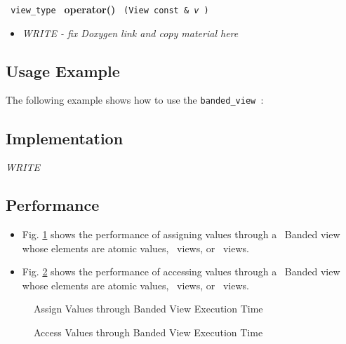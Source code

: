\noindent
\texttt{%
view\_type
}
\newline
\textbf{operator()}%
\texttt{%
(View const \&
\textit{v}%
)
}

\begin{itemize}
\item
\textit{WRITE - fix Doxygen link and copy material here}
\end{itemize}

\subsection{Usage Example} \label{sec-band-vw-use}

The following example shows how to use the \texttt{banded\_view }:


\subsection{Implementation} \label{sec-band-vw-impl}

\textit{WRITE}

\subsection{Performance} \label{sec-band-vw-perf}

\begin{itemize}
\item
Fig. \ref{fig:band-vw-assign-exper}
shows the performance of assigning values through a \stapl\ Banded view
whose elements are atomic values, \stl\ views, or \stapl\ views.
\item
Fig. \ref{fig:band-vw-access-exper}
shows the performance of accessing values through a \stapl\ Banded view
whose elements are atomic values, \stl\ views, or \stapl\ views.
\end{itemize}

\begin{figure}[p]
\caption{Assign Values through Banded View Execution Time}
\label{fig:band-vw-assign-exper}
\end{figure}

\begin{figure}[p]
\caption{Access Values through Banded View Execution Time}
\label{fig:band-vw-access-exper}
\end{figure}

